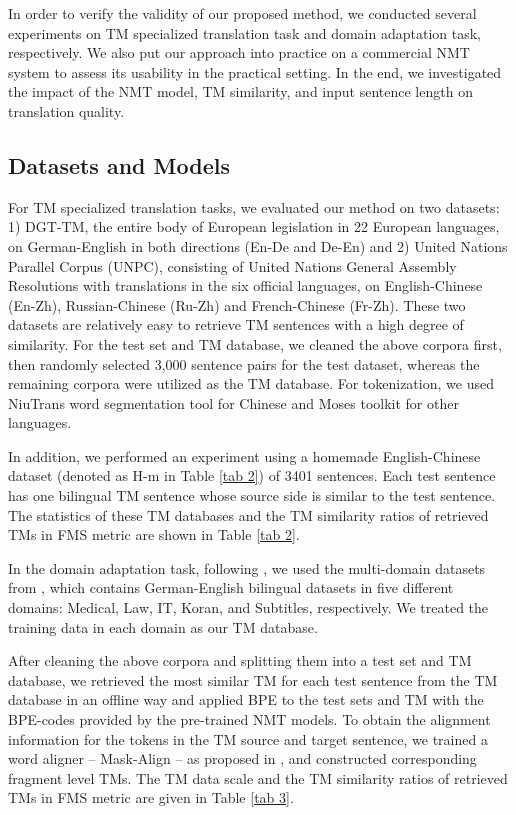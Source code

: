 \documentclass[letterpaper]{article} %
\begin{document}
In order to verify the validity of our proposed method, we conducted several experiments on TM specialized translation task and domain adaptation task, respectively. We also put our approach into practice on a commercial NMT system to assess its usability in the practical setting. In the end, we investigated the impact of the NMT model, TM similarity, and input sentence length on translation quality.

\subsection{Datasets and Models}

For TM specialized translation tasks, we evaluated our method on two datasets: 1) DGT-TM, the entire body of European legislation in 22 European languages, on German-English in both directions (En-De and De-En) and 2) United Nations Parallel Corpus (UNPC), consisting of United Nations General Assembly Resolutions with translations in the six official languages, on English-Chinese (En-Zh), Russian-Chinese (Ru-Zh) and French-Chinese (Fr-Zh). These two datasets are relatively easy to retrieve TM sentences with a high degree of similarity. For the test set and TM database, we cleaned the above corpora first, then randomly selected 3,000 sentence pairs for the test dataset, whereas the remaining corpora were utilized as the TM database. For tokenization, we used NiuTrans \cite{xiao2012niutrans} word segmentation tool for Chinese and
Moses toolkit \cite{philipp2007moses} for other languages.

In addition, we performed an experiment using a homemade English-Chinese dataset (denoted as H-m in Table \ref{tab 2}) of 3401 sentences. Each test sentence has one bilingual TM sentence whose source side is similar to the test sentence. The statistics of these TM databases and the TM similarity ratios of retrieved TMs in FMS metric are shown in Table \ref{tab 2}.
 
In the domain adaptation task, following \citet{khandelwal2020nearest}, we used the multi-domain datasets from \citet{aharoni2020unsupervised}, which contains German-English bilingual datasets in five different domains: Medical, Law, IT, Koran, and Subtitles, respectively. We treated the training data in each domain as our TM database.

After cleaning the above corpora and splitting them into a test set and TM database, we retrieved the most similar TM for each test sentence from the TM database in an offline way and applied BPE \cite{2016Neural} to the test sets and TM with the BPE-codes provided by the pre-trained NMT models. To obtain the alignment information for the tokens in the TM source and target sentence, we trained a word aligner -- Mask-Align -- as proposed in \citet{chen2021maskalign}, and constructed corresponding fragment level TMs. The TM data scale and the TM similarity ratios of retrieved TMs in FMS metric are given in Table \ref{tab 3}.
\end{document}
